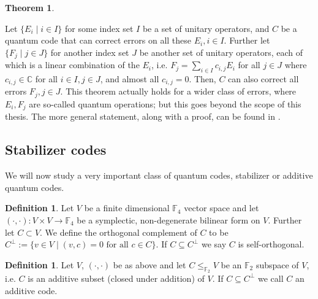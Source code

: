 \documentclass{article}
\def\F{\mathbb{F}}
\def\C{\mathbb{C}}
\def\fa{\text{ for all }}
\theoremstyle{definition}
\newtheorem{theorem}[Satz]{Theorem}
\newtheorem{defn}[Satz]{Definition}
\begin{document}
\begin{theorem}\label{linearcombinationerrors}

Let $\{ E_i \mid i \in I \}$ for some index set $I$ be a set of unitary operators, and $C$ be a quantum code that can correct errors on all these $E_i, i \in I$. Further let $\{ F_j \mid j \in J \}$ for another index set $J$ be another set of unitary operators, each of which is a linear combination of the $E_i$, i.e. $ F_j = \sum_{i \in I} c_{i,j} E_i$ for all $j \in J$ where $c_{i,j} \in \C$ for all $i \in I, j \in J$, and almost all $c_{i,j} = 0$.
Then, $C$ can also correct all errors $F_j, j \in J$. This theorem actually holds for a wider class of errors, where $E_i, F_j$ are so-called quantum operations; but this goes beyond the scope of this thesis. The more general statement, along with a proof, can be found in \cite{NC}.
\end{theorem}

\subsection{Stabilizer codes}

We will now study a very important class of quantum codes, stabilizer or additive quantum codes.

\begin{defn}
  Let $V$ be a finite dimensional $\F_4$ vector space and let $(\cdot, \cdot): V \times V \rightarrow \F_4$ be a symplectic, non-degenerate bilinear form on $V$. Further let $C \subset V$. We define the orthogonal complement of $C$ to be $C^\perp := \{ v \in V \mid (v,c) = 0 \fa c \in C \}$. If $C \subseteq C^\perp$ we say $C$ is self-orthogonal.
 \end{defn}

\begin{defn}
Let $V$, $(\cdot,\cdot)$ be as above and let $C \leq_{\F_2} V$ be an $\F_2$ subspace of $V$, i.e. $C$ is an additive subset (closed under addition) of $V$. If $C \subseteq C^\perp$ we call $C$ an additive code.
\end{defn}
\end{document}

